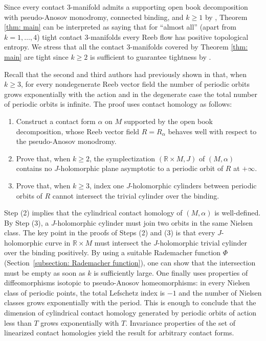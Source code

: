 \documentclass[JEP,XML,SOM,Unicode,NoFloatCountersInSection]{cedram}
\theoremstyle{plain}
\theoremstyle{definition}
\numberwithin{equation}{subsection}
\newcommand{\RR}{\mathbb{R}}
\begin{document}
Since every contact $3$-manifold admits a supporting open book decomposition with pseudo-Anosov monodromy, connected binding, and $k\geq 1$ by \cite{CH1}, Theorem \ref{thm: main} can be interpreted as saying that for ``almost all'' (apart from $k=1,\dots,4$) tight contact $3$-manifolds every Reeb flow has positive topological entropy.
We stress that all the contact $3$-manifolds covered by Theorem \ref{thm: main} are tight since $k\geq 2$ is sufficient to guarantee tightness by \cite[Th.\,2.3]{CH2}.

Recall that the second and third authors had previously shown in \cite[Th.\,2.3 and Corollary 2.6]{CH2} that, when $k\geq 3$, for every nondegenerate Reeb vector field the number of periodic orbits grows exponentially with the action and in the degenerate case the total number of periodic orbits is infinite. The proof uses contact homology as follows:
\begin{enumerate}
\item Construct a contact form $\alpha$ on $M$ supported by the open book decomposition, whose Reeb vector field $R=R_\alpha$ behaves well with respect to the pseudo-Anosov monodromy.
\item Prove that, when $k\geq 2$, the symplectization $(\RR\times M, J)$ of $(M,\alpha)$ contains no $J$-holomorphic plane asymptotic to a periodic orbit of $R$ at $+\infty$.
\item Prove that, when $k\geq 3$, index one $J$-holomorphic cylinders between periodic orbits of $R$ cannot intersect the trivial cylinder over the binding.
\end{enumerate}

Step (2) implies that the cylindrical contact homology of $(M,\alpha)$ is well-defined. By Step (3), a $J$-holomorphic cylinder must join two orbits in the same Nielsen class. The key point in the proofs of Steps (2) and (3) is that every $J$-holomorphic curve in $\RR\times M$ must intersect the $J$-holomorphic trivial cylinder over the binding positively. By using a suitable Rademacher function $\Phi$ (\cf Section~\ref{subsection: Rademacher function}), one can show that the intersection must be empty as soon as $k$ is sufficiently large. One finally uses properties of diffeomorphisms isotopic to pseudo-Anosov homeomorphisms: in every Nielsen class of periodic points, the total Lefschetz index is $-1$ and the number of Nielsen classes grows exponentially with the period. This is enough to conclude that the dimension of cylindrical contact homology generated by periodic orbits of action less than $T$ grows exponentially with $T$. Invariance properties of the set of linearized contact homologies yield the result for arbitrary contact forms.
\end{document}

